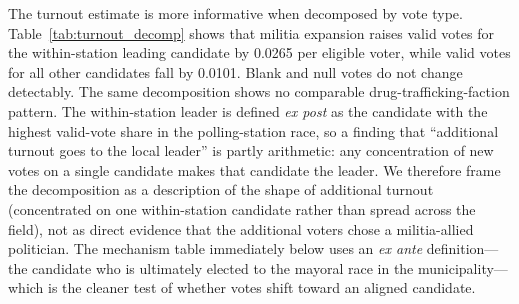 \documentclass[11pt]{article}
\begin{document}
The turnout estimate is more informative when decomposed by vote type. Table~\ref{tab:turnout_decomp} shows that militia expansion raises valid votes for the within-station leading candidate by 0.0265 per eligible voter, while valid votes for all other candidates fall by 0.0101. Blank and null votes do not change detectably. The same decomposition shows no comparable drug-trafficking-faction pattern. The within-station leader is defined \emph{ex post} as the candidate with the highest valid-vote share in the polling-station race, so a finding that ``additional turnout goes to the local leader'' is partly arithmetic: any concentration of new votes on a single candidate makes that candidate the leader. We therefore frame the decomposition as a description of the shape of additional turnout (concentrated on one within-station candidate rather than spread across the field), not as direct evidence that the additional voters chose a militia-allied politician. The mechanism table immediately below uses an \emph{ex ante} definition---the candidate who is ultimately elected to the mayoral race in the municipality---which is the cleaner test of whether votes shift toward an aligned candidate.
\end{document}

